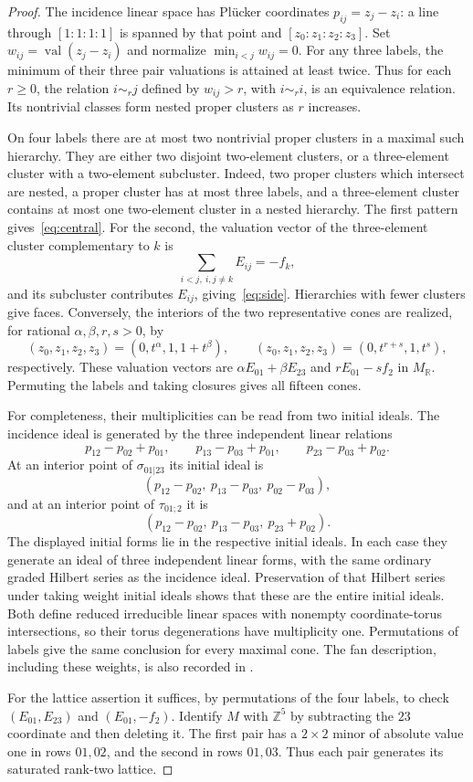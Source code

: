 \documentclass[11pt]{article}
\theoremstyle{definition}
\theoremstyle{remark}
\newcommand{\R}{\mathbb R}
\newcommand{\Z}{\mathbb Z}
\newcommand{\MR}{M_{\R}}
\begin{document}
\begin{proof}
The incidence linear space has Pl\"ucker coordinates
$p_{ij}=z_j-z_i$: a line through $[1:1:1:1]$ is spanned by that point
and $[z_0:z_1:z_2:z_3]$. Set $w_{ij}=\operatorname{val}(z_j-z_i)$
and normalize $\min_{i<j}w_{ij}=0$. For any three labels, the minimum
of their three pair valuations is attained at least twice. Thus for
each $r\ge0$, the relation $i\sim_r j$ defined by $w_{ij}>r$, with
$i\sim_r i$, is an equivalence relation. Its nontrivial classes form
nested proper clusters as $r$ increases.

On four labels there are at most two nontrivial proper clusters in
a maximal such hierarchy. They are either two disjoint two-element
clusters, or a three-element cluster with a two-element subcluster.
Indeed, two proper clusters which intersect are nested, a proper cluster
has at most three labels, and a three-element cluster contains at most
one two-element cluster in a nested hierarchy. The first pattern
gives~\eqref{eq:central}.
For the second, the valuation vector of the three-element cluster
complementary to $k$ is
\[
 \sum_{i<j,\ i,j\ne k}E_{ij}=-f_k,
\]
and its subcluster contributes $E_{ij}$, giving~\eqref{eq:side}.
Hierarchies with fewer clusters give faces. Conversely, the interiors
of the two representative cones are realized, for rational
$\alpha,\beta,r,s>0$, by
\[
 (z_0,z_1,z_2,z_3)=(0,t^\alpha,1,1+t^\beta),\qquad
 (z_0,z_1,z_2,z_3)=(0,t^{r+s},1,t^s),
\]
respectively. These valuation vectors are
$\alpha E_{01}+\beta E_{23}$ and $rE_{01}-sf_2$ in $\MR$.
Permuting the labels and taking closures gives all fifteen cones.

For completeness, their multiplicities can be read from two initial
ideals. The incidence ideal is generated by the three independent
linear relations
\[
 p_{12}-p_{02}+p_{01},\qquad
 p_{13}-p_{03}+p_{01},\qquad
 p_{23}-p_{03}+p_{02}.
\]
At an interior point of $\sigma_{01|23}$ its initial ideal is
\[
 (p_{12}-p_{02},\ p_{13}-p_{03},\ p_{02}-p_{03}),
\]
and at an interior point of $\tau_{01;2}$ it is
\[
 (p_{12}-p_{02},\ p_{13}-p_{03},\ p_{23}+p_{02}).
\]
The displayed initial forms lie in the respective initial ideals.
In each case they generate an ideal of three independent linear forms,
with the same ordinary graded Hilbert series as the incidence ideal.
Preservation of that Hilbert series under taking weight initial ideals
shows that these are the entire initial ideals. Both define reduced
irreducible linear spaces with nonempty coordinate-torus intersections,
so their torus degenerations have multiplicity one. Permutations of
labels give the same conclusion for every maximal cone.
The fan description, including these weights, is also recorded in
\cite[Section~3.1, Figure~3]{Tripoli}.

For the lattice assertion it suffices, by permutations of the four
labels, to check $(E_{01},E_{23})$ and $(E_{01},-f_2)$.
Identify $M$ with $\Z^5$ by subtracting the $23$ coordinate and then
deleting it. The first pair has a $2\times2$ minor of absolute value
one in rows $01,02$, and the second in rows $01,03$.
Thus each pair generates its saturated rank-two lattice.
\end{proof}
\end{document}

